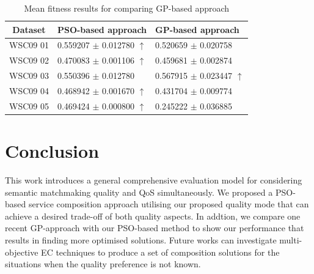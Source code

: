 \documentclass{llncs}
\begin{document}
\begin{table}[]
\centering
\caption{Mean fitness results for comparing GP-based approach}
\label{meanFitness}
\begin{tabular}{l|l|l}
\hline
\multicolumn{1}{c|}{Dataset} & PSO-based approach & GP-based approach  \\ \hline
WSC09 01                     &0.559207 $\pm$ 0.012780  $\uparrow$   &0.520659 $\pm$ 0.020758           \\ \hline
WSC09 02                     &0.470083 $\pm$  0.001106 $\uparrow$   &0.459681 $\pm$  0.002874          \\ \hline
WSC09 03                     & 0.550396 $\pm$ 0.012780              &0.567915 $\pm$ 0.023447 $\uparrow$   \\ \hline
WSC09 04                     & 0.468942 $\pm$ 0.001670  $\uparrow$  &0.431704 $\pm$ 0.009774            \\ \hline
WSC09 05                     & 0.469424 $\pm$ 0.000800  $\uparrow$  &0.245222 $\pm$ 0.036885            \\ \hline
\end{tabular}
\end{table}



\section{Conclusion}\label{conclusion}
This work introduces a general comprehensive evaluation model for considering semantic matchmaking quality and QoS simultaneously. We proposed a PSO-based service composition approach utilising our proposed quality mode that can achieve a desired trade-off of both quality aspects. In addtion, we compare one recent GP-approach with our PSO-based method to show our performance that results in finding more optimised solutions. Future works can investigate multi-objective EC techniques to produce a set of composition solutions for the situations when the quality preference is not known.




\end{document}
